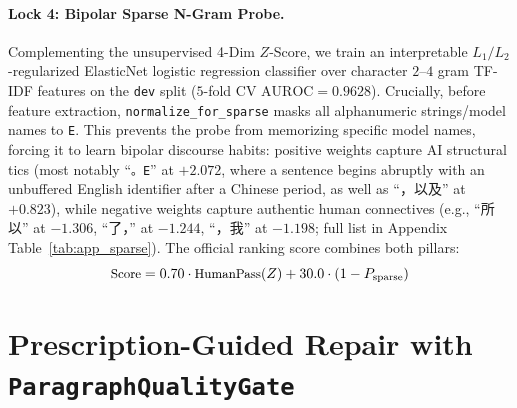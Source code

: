 \documentclass[11pt]{article}
\newcommand{\zh}[1]{#1}
\newcommand{\gate}{\texttt{ParagraphQualityGate}}
\begin{document}
\paragraph{Lock 4: Bipolar Sparse N-Gram Probe.}
Complementing the unsupervised 4-Dim $Z$-Score, we train an interpretable $L_1/L_2$-regularized ElasticNet logistic regression classifier over character $2$--$4$ gram TF-IDF features on the \texttt{dev} split ($5$-fold CV $\text{AUROC} = 0.9628$). Crucially, before feature extraction, \texttt{normalize\_for\_sparse} masks all alphanumeric strings/model names to \texttt{E}. This prevents the probe from memorizing specific model names, forcing it to learn bipolar discourse habits: positive weights capture AI structural tics (most notably ``\texttt{。E}'' at $+2.072$, where a sentence begins abruptly with an unbuffered English identifier after a Chinese period, as well as ``\zh{，以及}'' at $+0.823$), while negative weights capture authentic human connectives (e.g., ``\zh{所以}'' at $-1.306$, ``\zh{了，}'' at $-1.244$, ``\zh{，我}'' at $-1.198$; full list in Appendix Table~\ref{tab:app_sparse}). The official ranking score combines both pillars:
\begin{equation}
\small
\text{Score} = 0.70 \cdot \text{HumanPass}(Z) + 30.0 \cdot (1 - P_{\text{sparse}})
\label{eq:total}
\end{equation}

\section{Prescription-Guided Repair with \gate{}}
\label{sec:repair}
\end{document}
